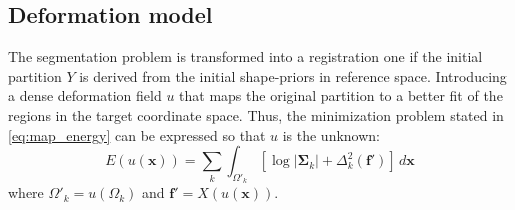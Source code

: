 \subsection{Deformation model}
\label{sec:deformation}
%
The segmentation problem is transformed into a registration one if the initial
partition $Y$ is derived from the initial shape-priors in reference space. 
Introducing a dense deformation field $u$ that maps the original partition to
a better fit of the regions in the target coordinate space. Thus, the minimization
problem stated in \autoref{eq:map_energy} can be expressed so that $u$ is the 
unknown:
\begin{equation}
E(u(\mathbf{x})) = \sum\limits_k \int_{\Omega'_k} \left[ \log \left|\mathbf{\Sigma}_k\right| + \Delta^2_k (\mathbf{f'}) \right] \,d\mathbf{x}
\label{eq:map_energy_deformation}
\end{equation}
where $\Omega'_k = u(\Omega_k)$ and $\mathbf{f'} = X(u(\mathbf{x}))$.



